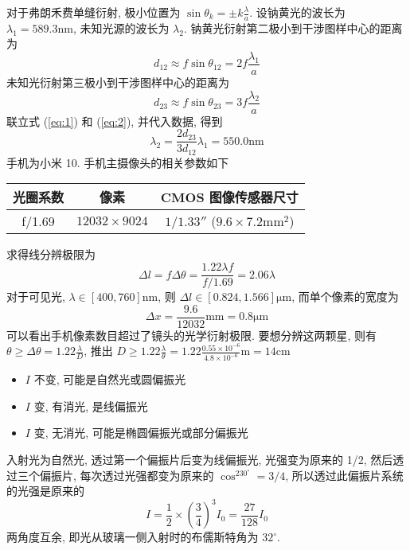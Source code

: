 \documentclass[11pt]{homework}
\begin{document}
\maketitle
\setcounter{questionCounter}{8}
\question
对于弗朗禾费单缝衍射, 极小位置为 $\sin\theta_k=\displaystyle \pm k\frac{\lambda}{a}$. 设钠黄光的波长为 $\lambda_1 = 589.3\mathrm{nm}$, 未知光源的波长为 $\lambda_2$.
钠黄光衍射第二极小到干涉图样中心的距离为
\begin{equation}
    \label{eq:1}
    d_{12} \approx f\sin\theta_{12}=2f\frac{\lambda_1}{a}
\end{equation}
未知光衍射第三极小到干涉图样中心的距离为
\begin{equation}
    \label{eq:2}
    d_{23} \approx f\sin\theta_{23}=3f\frac{\lambda_2}{a}
\end{equation}
联立式 (\ref{eq:1}) 和 (\ref{eq:2}), 并代入数据, 得到
\begin{equation}
    \lambda_2 = \frac{2d_{23}}{3d_{12}}\lambda_1 = 550.0\mathrm{nm}
\end{equation}
\question
手机为小米 10. 手机主摄像头的相关参数如下
\begin{center}
    \begin{tabular}{|c|c|c|}
        \hline
        光圈系数 & 像素               & CMOS 图像传感器尺寸 \\
        \hline
        f/1.69   & $12032\times 9024$ & $1/1.33''$ ($9.6 \times 7.2\mathrm{mm}^2$)         \\
        \hline
    \end{tabular}
\end{center}
求得线分辨极限为
\begin{equation}
    \Delta l = f\Delta \theta = \frac{1.22\lambda f}{f/1.69} = 2.06\lambda
\end{equation}
对于可见光, $\lambda \in [400,760]\mathrm{nm}$, 则 $\Delta l \in [0.824,1.566]\mathrm{\mu m}$, 
而单个像素的宽度为
\begin{equation}
    \Delta x = \frac{9.6}{12032}\mathrm{mm} = 0.8\mathrm{\mu m}
\end{equation}
可以看出手机像素数目超过了镜头的光学衍射极限.
\question
要想分辨这两颗星, 则有 $\theta\geq \Delta\theta = 1.22\displaystyle \frac{\lambda}{D}$, 推出 $D\geq 1.22\displaystyle\frac{\lambda}{\theta} = 1.22\frac{0.55\times 10^{-6}}{4.8\times 10^{-6}}\mathrm{m}=14\mathrm{cm}$
\newpage
\setcounter{questionCounter}{-1}
\begin{itemize}
    \item $I$ 不变, 可能是自然光或圆偏振光
    \item $I$ 变, 有消光, 是线偏振光
    \item $I$ 变, 无消光, 可能是椭圆偏振光或部分偏振光
\end{itemize}
\setcounter{questionCounter}{13}
\question
入射光为自然光, 透过第一个偏振片后变为线偏振光, 光强变为原来的 1/2, 然后透过三个偏振片, 每次透过光强都变为原来的 $\cos^230^\circ = 3/4$, 所以透过此偏振片系统的光强是原来的
\begin{equation}
    I=\frac{1}{2}\times\left(\frac{3}{4}\right)^3 I_0=\frac{27}{128}I_0
\end{equation}
\question
两角度互余, 即光从玻璃一侧入射时的布儒斯特角为 $32^\circ$.
\end{document}
